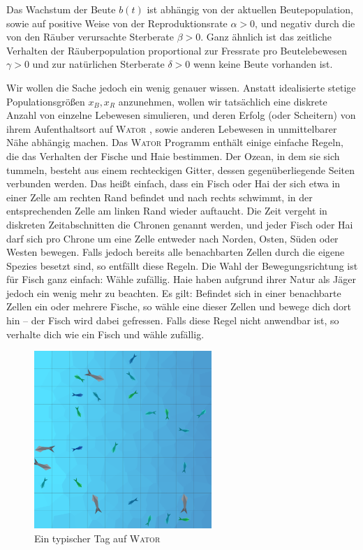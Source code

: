 \documentclass[a4paper,11pt]{article}
\newcommand{\wator}{\textsc{Wator }}
\theoremstyle{definition}
\numberwithin{equation}{section}
\begin{document}
	Das Wachstum der Beute $b(t)$ ist abhängig von der aktuellen Beutepopulation, sowie auf positive Weise von der Reproduktionsrate $\alpha > 0$, und negativ durch die von den Räuber verursachte Sterberate $\beta > 0$. Ganz ähnlich ist das zeitliche Verhalten der Räuberpopulation proportional zur Fressrate pro Beutelebewesen $\gamma > 0$ und zur natürlichen Sterberate $\delta > 0$ wenn keine Beute vorhanden ist. \newline

	Wir wollen die Sache jedoch ein wenig genauer wissen. Anstatt idealisierte stetige Populationsgrößen $x_B, x_R$ anzunehmen, wollen wir tatsächlich eine diskrete Anzahl von einzelne Lebewesen simulieren, und deren Erfolg (oder Scheitern) von ihrem Aufenthaltsort auf \wator, sowie anderen Lebewesen in unmittelbarer Nähe abhängig machen. Das \wator Programm enthält einige einfache Regeln, die das Verhalten der Fische und Haie bestimmen. Der Ozean, in dem sie sich tummeln, besteht aus einem rechteckigen Gitter, dessen gegenüberliegende Seiten verbunden werden. Das heißt einfach, dass ein Fisch oder Hai der sich etwa in einer Zelle am rechten Rand befindet und nach rechts schwimmt, in der entsprechenden Zelle am linken Rand wieder auftaucht. Die Zeit vergeht in diskreten Zeitabschnitten die Chronen genannt werden, und jeder Fisch oder Hai darf sich pro Chrone um eine Zelle entweder nach Norden, Osten, Süden oder Westen bewegen. Falls jedoch bereits alle benachbarten Zellen durch die eigene Spezies besetzt sind, so entfällt diese Regeln. Die Wahl der Bewegungsrichtung ist für Fisch ganz einfach: Wähle zufällig. Haie haben aufgrund ihrer Natur als Jäger jedoch ein wenig mehr zu beachten. Es gilt: Befindet sich in einer benachbarte Zellen ein oder mehrere Fische, so wähle eine dieser Zellen und bewege dich dort hin -- der Fisch wird dabei gefressen. Falls diese Regel nicht anwendbar ist, so verhalte dich wie ein Fisch und wähle zufällig. \newline

	\begin{figure}
		\centering
		\includegraphics[width=0.6\textwidth]{pictures/classic2.png}
		\caption{Ein typischer Tag auf \wator}
		\label{fig:wator}
	\end{figure}
\end{document}
